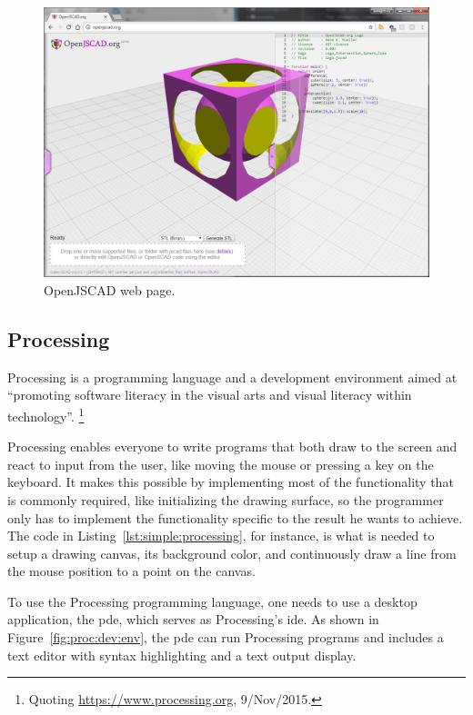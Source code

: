 \begin{figure}
	\centering
	\includegraphics[width=1.0\textwidth]{./images/openjscad_page}
	\caption{OpenJSCAD web page.}
	\label{fig:openjscad:page}
\end{figure}

\subsection{Processing}
\label{section:processing:related}
Processing\cite{reas2007processing} is a programming language and a development environment aimed at ``promoting software literacy in the visual arts and visual literacy within technology''.%
\footnote{Quoting \url{https://www.processing.org}, 9/Nov/2015.}

Processing enables everyone to write programs that both draw to the screen and react to input from the user, like moving the mouse or pressing a key on the keyboard.
It makes this possible by implementing most of the functionality that is commonly required, like initializing the drawing surface, so the programmer only has to implement the functionality specific to the result he wants to achieve.
The code in Listing~\ref{lst:simple:processing}, for instance, is what is needed to setup a drawing canvas, its background color, and continuously draw a line from the mouse position to a point on the canvas.

To use the Processing programming language, one needs to use a desktop application, the \acrfull{pde}, which serves as Processing's \gls{ide}.
As shown in Figure~\ref{fig:proc:dev:env}, the \gls{pde} can run Processing programs and includes a text editor with syntax highlighting and a text output display.

